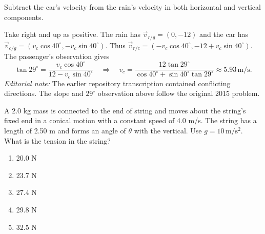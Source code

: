 \begin{answerbox}
\end{answerbox}
\begin{insightbox}
Subtract the car's velocity from the rain's velocity in both horizontal and vertical components.
\end{insightbox}
\begin{solutionbox}

Take right and up as positive. The rain has $\vec v_{r/g}=(0,-12)$ and the car has $\vec v_{c/g}=(v_c\cos40^\circ,-v_c\sin40^\circ)$. Thus $\vec v_{r/c}=(-v_c\cos40^\circ,-12+v_c\sin40^\circ)$. The passenger's observation gives
\[
\tan29^\circ=\frac{v_c\cos40^\circ}{12-v_c\sin40^\circ}
\quad\Rightarrow\quad
v_c=\frac{12\tan29^\circ}{\cos40^\circ+\sin40^\circ\tan29^\circ}
\approx5.93\,\mathrm{m/s}.
\]
\emph{Editorial note:} The earlier repository transcription contained conflicting directions. The slope and $29^\circ$ observation above follow the original 2015 problem.
\end{solutionbox}

\item \label{prob:27}
\noindent\begin{minipage}[t]{0.6\linewidth}
\vspace{0pt}
A 2.0 kg mass is connected to the end of string and moves about the string’s fixed end in a conical motion with a constant speed of 4.0 m/s. The string has a length of 2.50 m and forms an angle of $\theta$ with the vertical. Use $g=10\,\mathrm{m/s^2}$. What is the tension in the string?
\begin{enumerate}[label=(\Alph*)]
    \item 20.0 N
    \item 23.7 N
    \item 27.4 N
    \item 29.8 N
    \item 32.5 N
\end{enumerate}
\end{minipage}%
\hfill
\begin{minipage}[t]{0.35\linewidth}
\vspace{0pt}
\centering
{}
\end{minipage}

